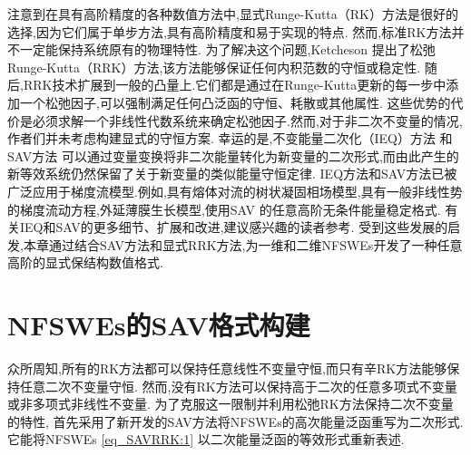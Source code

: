 注意到在具有高阶精度的各种数值方法中,显式Runge-Kutta（RK）方法是很好的选择,因为它们属于单步方法,具有高阶精度和易于实现的特点.
然而,标准RK方法并不一定能保持系统原有的物理特性.
为了解决这个问题,Ketcheson \cite{ketchesonRelaxationRungeKutta2019} 提出了松弛Runge-Kutta（RRK）方法,该方法能够保证任何内积范数的守恒或稳定性.
随后,RRK技术\cite{ranochaRelaxationRungeKutta2020}扩展到一般的凸量上.它们都是通过在Runge-Kutta更新的每一步中添加一个松弛因子,可以强制满足任何凸泛函的守恒、耗散或其他属性.
这些优势的代价是必须求解一个非线性代数系统来确定松弛因子.然而,对于非二次不变量的情况,作者们并未考虑构建显式的守恒方案.
幸运的是,不变能量二次化（IEQ）方法 \cite{yangLinearUnconditionallyEnergy2017, yangEfficientLinearSchemes2017} 和SAV方法 \cite{chengConvergenceEnergyconservingScheme2022} 可以通过变量变换将非二次能量转化为新变量的二次形式,而由此产生的新等效系统仍然保留了关于新变量的类似能量守恒定律.
IEQ方法和SAV方法已被广泛应用于梯度流模型.例如,具有熔体对流\cite{chenEfficientNumericalScheme2019}的树状凝固相场模型,具有一般非线性势的梯度流动方程\cite{yangConvergenceAnalysisInvariant2020},外延薄膜生长模型\cite{chengHighlyEfficientAccurate2019},使用SAV 的任意高阶无条件能量稳定格式\cite{gongArbitrarilyHighorderUnconditionally2019}.
有关IEQ和SAV的更多细节、扩展和改进,建议感兴趣的读者参考\cite{zhaoNumericalApproximationsPhase2017,shenScalarAuxiliaryVariable2018,liuExponentialScalarAuxiliary2020,chengMultipleScalarAuxiliary2018}.
受到这些发展的启发,本章通过结合SAV方法和显式RRK方法,为一维和二维NFSWEs开发了一种任意高阶的显式保结构数值格式.

\section{NFSWEs的SAV格式构建}\label{Section_SAVRRK: 2}

众所周知,所有的RK方法都可以保持任意线性不变量守恒,而只有辛RK方法能够保持任意二次不变量守恒.
然而,没有RK方法可以保持高于二次的任意多项式不变量或非多项式非线性不变量.
为了克服这一限制并利用松弛RK方法保持二次不变量的特性,
首先采用了新开发的SAV方法将NFSWEs的高次能量泛函重写为二次形式.
它能将NFSWEs \eqref{eq_SAVRRK:1} 以二次能量泛函的等效形式重新表述.

